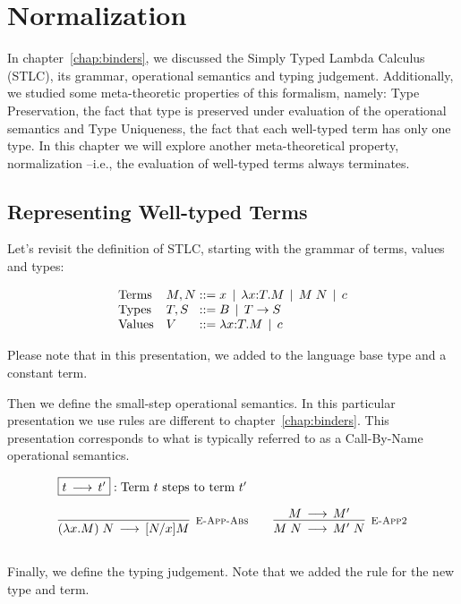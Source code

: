 \chapter{Normalization}\label{chap:normalization}

In chapter~\ref{chap:binders}, we discussed the Simply Typed Lambda
Calculus (STLC), its grammar, operational semantics and typing
judgement. Additionally, we studied some meta-theoretic properties of
this formalism, namely: Type Preservation, the fact that type is
preserved under evaluation of the operational semantics and Type
Uniqueness, the fact that each well-typed term has only one type. In
this chapter we will explore another meta-theoretical property,
normalization --i.e., the evaluation of well-typed terms always
terminates.

\section{Representing Well-typed Terms}

Let's revisit the definition of STLC, starting with the grammar of terms, values and types:

\[
\begin{array}{ll@{\bnfas}l}
\mbox{Terms} & M, N & x \bnfalt \lam x{:}T.M \bnfalt M \app N \bnfalt c\\
\mbox{Types} & T, S & B \bnfalt T \arrow S\\
\mbox{Values} & V & \lam x{:}T.M \bnfalt c
\end{array}
\]

Please note that in this presentation, we added to the language base
type and a constant term.

Then we define the small-step operational semantics. In this
particular presentation we use rules are different to
chapter~\ref{chap:binders}. This presentation corresponds to what is
typically referred to as a Call-By-Name operational semantics.

\[
\begin{array}{c}
\multicolumn{1}{l}{\fbox{$t \Steps t'$}: \mbox{Term $t$ steps to term $t'$}}
\\[1em]
\infer[\EAppBeta]{(\lam x.M) \app N \Steps [N/x]M}{} \qquad
\infer[\EAppArgStep]{M \app N \Steps M'\;N}{M \Steps M'} \\[1em]
\end{array}
\]

Finally, we define the typing judgement. Note that we added the rule
\TBase for the new type and term.

